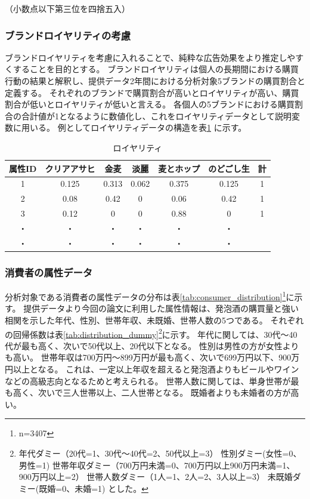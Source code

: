 \documentclass[11pt]{jsarticle}
\begin{document}
（小数点以下第三位を四捨五入）

\subsubsection{ブランドロイヤリティの考慮}
\label{subsec:royality}
ブランドロイヤリティを考慮に入れることで、純粋な広告効果をより推定しやすくすることを目的とする。
ブランドロイヤリティは個人の長期間における購買行動の結果と解釈し、提供データ2年間における分析対象5ブランドの購買割合と定義する。
それぞれのブランドで購買割合が高いとロイヤリティが高い、購買割合が低いとロイヤリティが低いと言える。
各個人の5ブランドにおける購買割合の合計値が1となるように数値化し、これをロイヤリティデータとして説明変数に用いる。
例としてロイヤリティデータの構造を表\ref{tab:royality_ex} に示す。

\begin{table}[htbp]
  \centering
  \caption{ロイヤリティ}
\begin{center}
 \begin{tabular}{c|ccccc|c} \hline
   属性ID & クリアアサヒ & 金麦 & 淡麗 & 麦とホップ & のどごし生 & 計 \\ \hline
   1 & 0.125 & 0.313 & 0.062 & 0.375 & 0.125 & 1 \\
   2 & 0.08 & 0.42 & 0 & 0.06 & 0.42 & 1 \\
   3 & 0.12 & 0 & 0 & 0.88 & 0 & 1 \\
   ・ & ・ & ・ & ・ & ・ & ・ & \\
   ・ & ・ & ・ & ・ & ・ & ・ & \\  
  \end{tabular}
  \label{tab:royality_ex}
 \end{center}
\end{table}

\newpage

\subsubsection{消費者の属性データ}
\label{subsec:consumer_distribution}
分析対象である消費者の属性データの分布は表\ref{tab:consumer_distribution}\footnote{n=3407}に示す。
提供データより今回の論文に利用した属性情報は、発泡酒の購買量と強い相関を示した年代、性別、世帯年収、未既婚、世帯人数の5つである。
それぞれの回帰係数は表\ref{tab:distribution_dummy}\footnote{年代ダミー（20代=1、30代〜40代=2、50代以上=3）
性別ダミー(女性=0、男性=1)
世帯年収ダミー（700万円未満=0、700万円以上900万円未満=1、900万円以上=2）
世帯人数ダミー（1人=1、2人=2、3人以上=3）
未既婚ダミー(既婚=0、未婚=1)
とした。}に示す。
年代に関しては、30代〜40代が最も高く、次いで50代以上、20代以下となる。
性別は男性の方が女性よりも高い。
世帯年収は700万円〜899万円が最も高く、次いで699万円以下、900万円以上となる。
これは、一定以上年収を超えると発泡酒よりもビールやワインなどの高級志向となるためと考えられる。
世帯人数に関しては、単身世帯が最も高く、次いで三人世帯以上、二人世帯となる。
既婚者よりも未婚者の方が高い。
\end{document}
